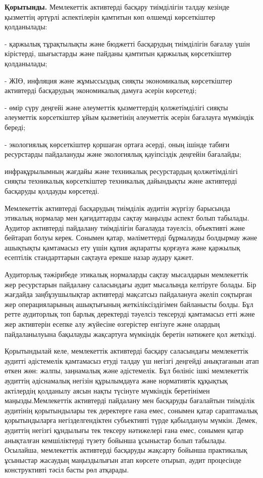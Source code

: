 \begin{multicols}{2}
{\bfseries Қорытынды.} Мемлекеттік активтерді басқару тиімділігін талдау
кезінде қызметтің әртүрлі аспектілерін қамтитын көп өлшемді көрсеткіштер
қолданылады:

- қаржылық тұрақтылықты және бюджетті басқарудың тиімділігін бағалау
үшін кірістерді, шығыстарды және пайданы қамтитын қаржылық көрсеткіштер
қолданылады;

- ЖІӨ, инфляция және жұмыссыздық сияқты экономикалық көрсеткіштер
активтерді басқарудың экономикалық дамуға әсерін көрсетеді;

- өмір сүру деңгейі және әлеуметтік қызметтердің қолжетімділігі сияқты
әлеуметтік көрсеткіштер ұйым қызметінің әлеуметтік әсерін бағалауға
мүмкіндік береді;

- экологиялық көрсеткіштер қоршаған ортаға әсерді, оның ішінде табиғи
ресурстарды пайдалануды және экологиялық қауіпсіздік деңгейін бағалайды;

инфрақұрылымның жағдайы және техникалық ресурстардың қолжетімділігі
сияқты техникалық көрсеткіштер техникалық дайындықты және активтерді
басқаруды қолдауды көрсетеді.

Мемлекеттік активтерді басқарудың тиімділік аудитін жүргізу барысында
этикалық нормалар мен қағидаттарды сақтау маңызды аспект болып табылады.
Аудитор активтерді пайдалану тиімділігін бағалауда тәуелсіз, объективті
және бейтарап болуы керек. Сонымен қатар, мәліметтерді бұрмалауды
болдырмау және ашықтықты қамтамасыз ету үшін құпия ақпаратты қорғауға
және қаржылық есептілік стандарттарын сақтауға ерекше назар аудару
қажет.

Аудиторлық тәжірибеде этикалық нормаларды сақтау мысалдарын мемлекеттік
жер ресурстарын пайдалану саласындағы аудит мысалында келтіруге болады.
Бір жағдайда заңбұзушылықтар активтерді мақсатсыз пайдалануға әкеліп
соқтырған жер операцияларының ашықтығының жеткіліксіздігімен байланысты
болды. Бұл ретте аудиторлық топ барлық деректерді тәуелсіз тексеруді
қамтамасыз етті және жер активтерін есепке алу жүйесіне өзгерістер
енгізуге және олардың пайдаланылуына бақылауды жақсартуға мүмкіндік
беретін нәтижеге қол жеткізді.

Қорытындылай келе, мемлекеттік активтерді басқару саласындағы
мемлекеттік аудитті әдістемелік қамтамасыз етуді талдау үш негізгі
деңгейді анықтағанын атап өткен жөн: жалпы, заңнамалық және әдістемелік.
Бұл бөлініс ішкі мемлекеттік аудиттің әдіснамалық негізін құрылымдауға
және нормативтік құқықтық актілердің қолданылу аясын нақты түсінуге
мүмкіндік беретінімен маңызды.Мемлекеттік активтерді пайдалану мен
басқаруды бағалайтын тиімділік аудитінің қорытындылары тек деректерге
ғана емес, сонымен қатар сараптамалық қорытындыларға негізделгендіктен
субъективті түрде қабылдануы мүмкін. Демек, аудиттің негізгі құндылығы
тек тексеру нәтижелері ғана емес, сонымен қатар анықталған кемшіліктерді
түзету бойынша ұсыныстар болып табылады. Осылайша, мемлекеттік
активтерді басқаруды жақсарту бойынша практикалық ұсыныстар жасаудың
маңыздылығын атап көрсете отырып, аудит процесінде конструктивті тәсіл
басты рөл атқарады.
\end{multicols}

